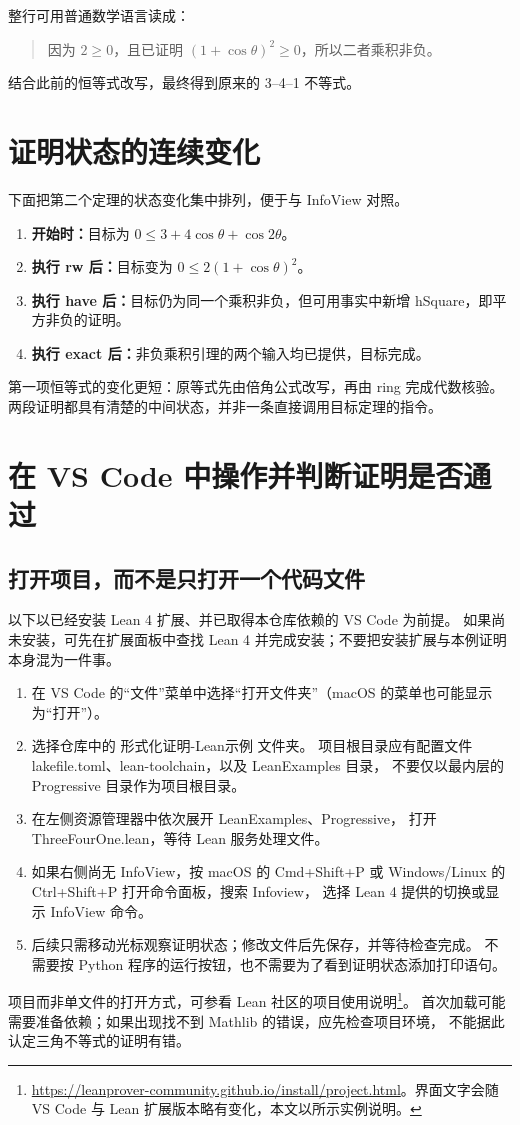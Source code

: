 \documentclass[UTF8,fontset=fandol,a4paper,11pt]{ctexart}
\newcommand{\code}[1]{{\small\ttfamily\def\_{\textunderscore\allowbreak}#1}}
\newcommand{\step}[1]{\Needspace{7\baselineskip}\subsection{#1}}
\begin{document}
整行可用普通数学语言读成：
\begin{quote}
因为 $2\ge0$，且已证明 $(1+\cos\theta)^2\ge0$，所以二者乘积非负。
\end{quote}
结合此前的恒等式改写，最终得到原来的 3–4–1 不等式。

\section{证明状态的连续变化}

下面把第二个定理的状态变化集中排列，便于与 InfoView 对照。
\begin{enumerate}
  \item \textbf{开始时：}目标为 $0\le3+4\cos\theta+\cos2\theta$。
  \item \textbf{执行 \code{rw} 后：}目标变为 $0\le2(1+\cos\theta)^2$。
  \item \textbf{执行 \code{have} 后：}目标仍为同一个乘积非负，但可用事实中新增
    \code{hSquare}，即平方非负的证明。
  \item \textbf{执行 \code{exact} 后：}非负乘积引理的两个输入均已提供，目标完成。
\end{enumerate}
第一项恒等式的变化更短：原等式先由倍角公式改写，再由 \code{ring} 完成代数核验。
两段证明都具有清楚的中间状态，并非一条直接调用目标定理的指令。

\section{在 VS Code 中操作并判断证明是否通过}

\step{打开项目，而不是只打开一个代码文件}
以下以已经安装 Lean 4 扩展、并已取得本仓库依赖的 VS Code 为前提。
如果尚未安装，可先在扩展面板中查找 Lean 4 并完成安装；不要把安装扩展与本例证明本身混为一件事。
\begin{enumerate}
  \item 在 VS Code 的“文件”菜单中选择“打开文件夹”（macOS 的菜单也可能显示为“打开”）。
  \item 选择仓库中的 \code{形式化证明-Lean示例} 文件夹。
    项目根目录应有配置文件 \code{lakefile.toml}、\code{lean-toolchain}，以及 \code{LeanExamples} 目录，
    不要仅以最内层的 \code{Progressive} 目录作为项目根目录。
  \item 在左侧资源管理器中依次展开 \code{LeanExamples}、\code{Progressive}，
    打开 \code{ThreeFourOne.lean}，等待 Lean 服务处理文件。
  \item 如果右侧尚无 InfoView，按 macOS 的 \code{Cmd+Shift+P} 或
    Windows/Linux 的 \code{Ctrl+Shift+P} 打开命令面板，搜索 \code{Infoview}，
    选择 Lean 4 提供的切换或显示 InfoView 命令。
  \item 后续只需移动光标观察证明状态；修改文件后先保存，并等待检查完成。
    不需要按 Python 程序的运行按钮，也不需要为了看到证明状态添加打印语句。
\end{enumerate}
项目而非单文件的打开方式，可参看 Lean 社区的项目使用说明\footnote{\url{https://leanprover-community.github.io/install/project.html}。界面文字会随 VS Code 与 Lean 扩展版本略有变化，本文以所示实例说明。}。
首次加载可能需要准备依赖；如果出现找不到 \code{Mathlib} 的错误，应先检查项目环境，
不能据此认定三角不等式的证明有错。
\end{document}

